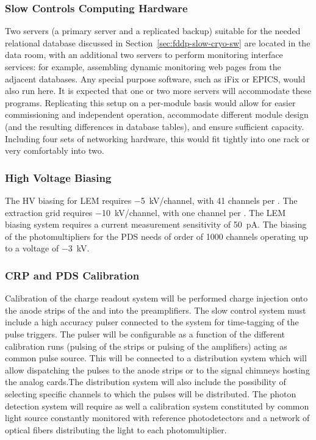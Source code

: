 \subsubsection{Slow Controls Computing Hardware}
\label{sec:fddp-slow-cryo-slow-compute}

Two servers (a primary server and a replicated backup) suitable for the needed relational database discussed
in Section~\ref{sec:fddp-slow-cryo-sw} are located in the  data
room, with an additional
two servers to perform  monitoring interface services: for
example, assembling dynamic  monitoring web pages from the adjacent
databases.  Any special purpose software, such as iFix or EPICS, would
also run here. It is expected that one or two more servers will accommodate
these programs.
Replicating this setup on a per-module basis would allow for easier
commissioning and independent operation, accommodate different module
design (and the resulting differences in database tables), and ensure
sufficient capacity.  Including four sets of networking hardware, this
would fit tightly into one rack or very comfortably into two.

\subsubsection{High Voltage Biasing}
\label{sec:fddp-slow-cryo-slow-hvbias}

The HV biasing for LEM requires \SI{-5}{kV/channel}, with 41 channels per .  The extraction grid requires \SI{-10}{kV/channel}, with  one channel per . The LEM biasing system requires a current measurement sensitivity of \SI{50}{pA}. The biasing of the photomultipliers for the PDS needs of order of \num{1000} channels operating up to a voltage of \SI{-3}{kV}.

\subsubsection{CRP and PDS Calibration}
\label{sec:fddp-slow-cryo-slow-crppdscalib}

Calibration of the charge readout system will be performed  charge injection onto the anode strips of the  and into the preamplifiers. The slow control system must include a high accuracy pulser connected to the  system for time-tagging of the pulse triggers. The pulser will be configurable as a function of the different calibration runs (pulsing of the strips or pulsing of the amplifiers) acting as common pulse source. This will be connected to a distribution system which will allow dispatching the pulses to the  anode strips or to the signal chimneys hosting the analog  cards.The distribution system will also include the possibility of selecting specific channels to which the pulses will be distributed. The photon detection system will require as well a calibration system constituted by common light source constantly monitored with reference photodetectors and a network of optical fibers distributing the light to each photomultiplier.

